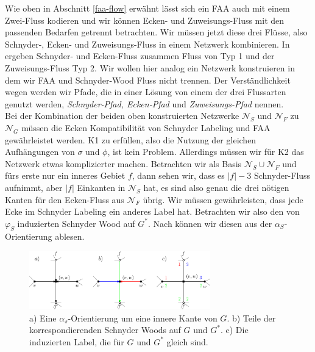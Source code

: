 Wie oben in Abschnitt \ref{faa-flow} erwähnt lässt sich ein FAA auch mit einem Zwei-Fluss kodieren und wir können Ecken- und Zuweisungs-Fluss mit den passenden Bedarfen getrennt betrachten. Wir müssen jetzt diese drei Flüsse, also Schnyder-, Ecken- und Zuweisungs-Fluss in einem Netzwerk kombinieren. In \cite{af15} ergeben Schnyder- und Ecken-Fluss zusammen Fluss von Typ 1 und der Zuweisungs-Fluss Typ 2. Wir wollen hier analog ein Netzwerk konstruieren in dem wir FAA und Schnyder-Wood Fluss nicht trennen. Der Verständlichkeit wegen werden wir Pfade, die in einer Lösung von einem der drei Flussarten genutzt werden, \textit{Schnyder-Pfad, Ecken-Pfad} und \textit{Zuweisungs-Pfad} nennen.\\

Bei der Kombination der beiden oben konstruierten Netzwerke $\mathcal{N}_S$ und $\mathcal{N}_F$ zu $\mathcal{N}_G$ müssen die Ecken Kompatibilität von Schnyder Labeling und FAA gewährleistet werden. K1 zu erfüllen, also die Nutzung der gleichen Aufhängungen von $\sigma$ und $\phi$, ist kein Problem. Allerdings müssen wir für K2 das Netzwerk etwas komplizierter machen. Betrachten wir als Basis $\mathcal{N}_S \cup \mathcal{N}_F$ und fürs erste nur ein inneres Gebiet $f$, dann sehen wir, dass es $|f|-3$ Schnyder-Fluss aufnimmt, aber $|f|$ Einkanten in $\mathcal{N}_S$ hat, es sind also genau die drei nötigen Kanten für den Ecken-Fluss aus $\mathcal{N}_F$ übrig. Wir müssen gewährleisten, dass jede Ecke im Schnyder Labeling ein anderes Label hat. Betrachten wir also den von $\varphi_S$ induzierten Schnyder Wood auf $G^*$. Nach \cite{felsner12} können wir diesen aus der $\alpha_S$-Orientierung ablesen. 

\begin{figure}[h]
	\centering
  	\includegraphics[width=0.7\textwidth]{alpha_bij.png}
  	\caption{a) Eine $\alpha_s$-Orientierung um eine innere Kante von $G$. b) Teile der korrespondierenden Schnyder Woods auf $G$ und $G^*$. c) Die induzierten Label, die für $G$ und $G^*$ gleich sind.}
	\label{alpha_bij}
\end{figure}

